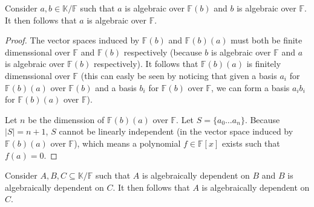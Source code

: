 \begin{lemma}\label{lem:algebraic-transitivity}
  Consider $a, b \in \mathbb K / \mathbb{F} $ such that $a$ is algebraic over $\mathbb{F}(b) $ and $b$ is algebraic over $\mathbb{F}$. It then follows that $a$ is algebraic over $\mathbb{F}$.
\end{lemma}

\begin{proof}
  The vector spaces induced by $\mathbb{F} (b)$ and $\mathbb{F} (b)(a)$ must both be finite dimenssional over $\mathbb{F} $ and $\mathbb{F} (b)$ respectively (because $b$ is algebraic over $\mathbb{F} $ and $a$ is algebraic over $\mathbb{F} (b)$ respectively). It follows that $\mathbb{F} (b)(a)$ is finitely dimenssional over $\mathbb{F}$ (this can easly be seen by noticing that given a basis $a _i $ for $\mathbb{F} (b)(a)$ over $\mathbb{F} (b)$ and a basis $b _i $ for $\mathbb{F} (b)$ over $\mathbb{F} $, we can form a basis $a _i b _i $ for $\mathbb{F} (b)(a)$ over $\mathbb{F} $). 

  Let $n$ be the dimenssion of $\mathbb{F} (b)(a)$ over $\mathbb{F} $. Let $S = \{a _0 \ldots a _n \}$. Because $|S| = n + 1$, $S$ cannot be linearly independent (in the vector space induced by $\mathbb{F} (b)(a)$ over $\mathbb{F} $), which means a polynomial $f \in \mathbb{F} [x]$ exists such that $f(a) = 0$.
\end{proof}

\begin{lemma}\label{lem:algebraic-dependence-transitivity}
  Consider $A, B, C \subseteq \mathbb K / \mathbb{F} $ such that $A$ is algebraically dependent on $B$ and $B$ is algebraically dependent on $C$. It then follows that $A$ is algebraically dependent on $C$.
\end{lemma}

